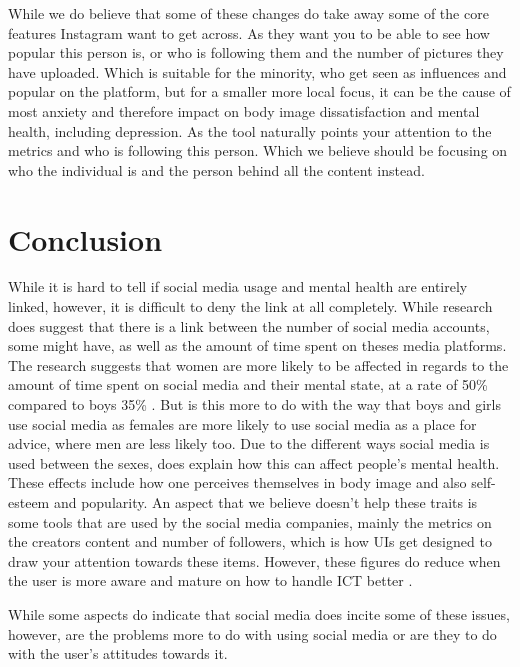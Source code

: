 \documentclass{sigchi}
\begin{document}
	While we do believe that some of these changes do take away some of the core features Instagram want to get across. As they want you to be able to see how popular this person is, or who is following them and the number of pictures they have uploaded. Which is suitable for the minority, who get seen as influences and popular on the platform, but for a smaller more local focus, it can be the cause of most anxiety and therefore impact on body image dissatisfaction and mental health, including depression. As the tool naturally points your attention to the metrics and who is following this person. Which we believe should be focusing on who the individual is and the person behind all the content instead.
	
\section{Conclusion}
	While it is hard to tell if social media usage and mental health are entirely linked, however, it is difficult to deny the link at all completely. While research does suggest that there is a link between the number of social media accounts, some might have, as well as the amount of time spent on theses media platforms. The research suggests that women are more likely to be affected in regards to the amount of time spent on social media and their mental state, at a rate of 50\% compared to boys 35\% \cite{kelly2018social}. But is this more to do with the way that boys and girls use social media as females are more likely to use social media as a place for advice, where men are less likely too. Due to the different ways social media is used between the sexes, does explain how this can affect people's mental health. These effects include how one perceives themselves in body image and also self-esteem and popularity. An aspect that we believe doesn't help these traits is some tools that are used by the social media companies, mainly the metrics on the creators content and number of followers, which is how UIs get designed to draw your attention towards these items. However, these figures do reduce when the user is more aware and mature on how to handle ICT better \cite{kraut2002internet}. 
		
	While some aspects do indicate that social media does incite some of these issues, however, are the problems more to do with using social media or are they to do with the user's attitudes towards it. 
	
	
\balance{}



\end{document}
